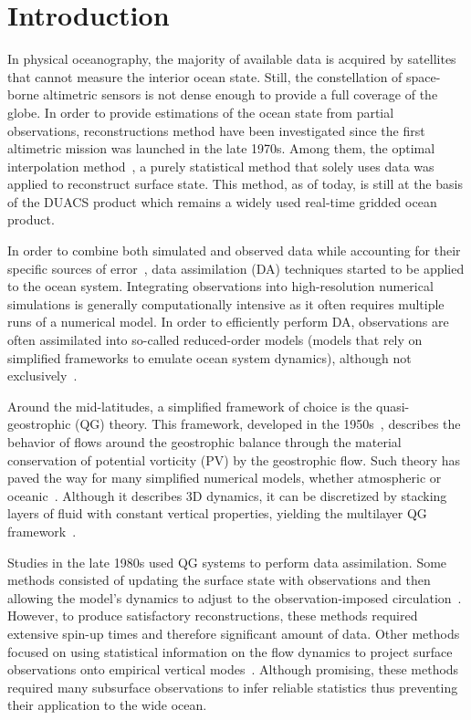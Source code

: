 \documentclass[
  draft
]{agujournal2025}
\begin{document}
\begin{abstract}
\begin{plainlanguagesummary}
    \end{plainlanguagesummary}
\end{abstract}

\section{Introduction}\label{sec:introduction}

In physical oceanography, the majority of available data is acquired by satellites that cannot measure the interior ocean state. Still, the constellation of space-borne altimetric sensors is not dense enough to provide a full coverage of the globe. In order to provide estimations of the ocean state from partial observations, reconstructions method have been investigated since the first altimetric mission was launched in the late 1970s. Among them, the optimal interpolation method~\cite{rienecker1991,traon1998}, a purely statistical method that solely uses data was applied to reconstruct surface state. This method, as of today, is still at the basis of the DUACS product which remains a widely used real-time gridded ocean product.

In order to combine both simulated and observed data while accounting for their specific sources of error~\cite{lahoz2010}, data assimilation (DA) techniques started to be applied to the ocean system. Integrating observations into high-resolution numerical simulations is generally computationally intensive as it often requires multiple runs of a numerical model. In order to efficiently perform DA, observations are often assimilated into so-called reduced-order models (models that rely on simplified frameworks to emulate ocean system dynamics), although not exclusively~\cite{mogensen2012,cooper1996}.

Around the mid-latitudes, a simplified framework of choice is the quasi-geostrophic (QG) theory. This framework, developed in the 1950s~\cite{charney1950,charney1953}, describes the behavior of flows around the geostrophic balance through the material conservation of potential vorticity (PV) by the geostrophic flow. Such theory has paved the way for many simplified numerical models, whether atmospheric or oceanic~\cite{phillips1951,held1995}. Although it describes 3D dynamics, it can be discretized by stacking layers of fluid with constant vertical properties, yielding the multilayer QG framework~\cite{vallis2006}. 

Studies in the late 1980s used QG systems to perform data assimilation. Some methods consisted of updating the surface state with observations and then allowing the model's dynamics to adjust to the observation\nobreak{}-\nobreak{}imposed circulation~\cite{haines1991}. However, to produce satisfactory reconstructions, these methods required extensive spin-up times and therefore significant amount of data. Other methods focused on using statistical information on the flow dynamics to project surface observations onto empirical vertical modes~\cite{mey1987}. Although promising, these methods required many subsurface observations to infer reliable statistics thus preventing their application to the wide ocean.
\end{document}
